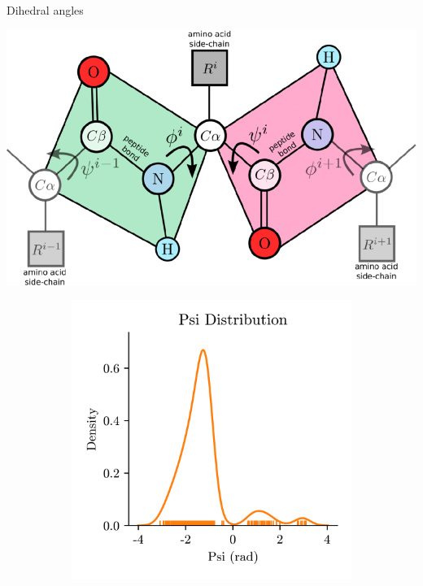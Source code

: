 \documentclass[aspectratio=169, 10pt, dvipsnames]{beamer}
\begin{document}
{
  \begin{frame}[fragile]{Dihedral angles}
    \begin{minipage}{0.4\textwidth}
      \centering
      \includegraphics[width=\textwidth]{./figures/phi_psi.png}
    \end{minipage}
    \pause\begin{minipage}{0.3\textwidth}
      \begin{adjustbox}{minipage=\linewidth,scale=0.8}
        \begin{figure}
          \centering
          \begin{subfigure}{\textwidth}
            \includegraphics[width=\textwidth]{./figures/dehedral_dist_psi.png}

\end{subfigure}
\end{figure}
\end{adjustbox}
\end{minipage}
\end{frame}}
\end{document}
